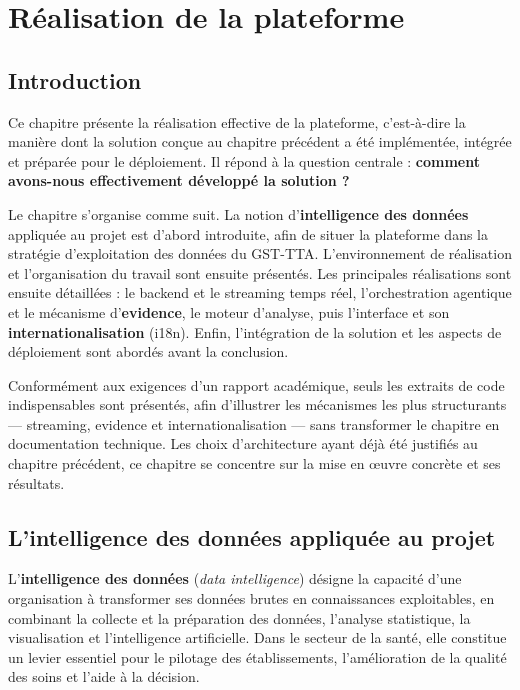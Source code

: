 \chapter{Réalisation de la plateforme}

\section{Introduction}

Ce chapitre présente la réalisation effective de la plateforme, c'est-à-dire la manière dont la solution conçue au chapitre précédent a été implémentée, intégrée et préparée pour le déploiement. Il répond à la question centrale : \textbf{comment avons-nous effectivement développé la solution ?}

Le chapitre s'organise comme suit. La notion d'\textbf{intelligence des données} appliquée au projet est d'abord introduite, afin de situer la plateforme dans la stratégie d'exploitation des données du GST-TTA. L'environnement de réalisation et l'organisation du travail sont ensuite présentés. Les principales réalisations sont ensuite détaillées : le backend et le streaming temps réel, l'orchestration agentique et le mécanisme d'\textbf{evidence}, le moteur d'analyse, puis l'interface et son \textbf{internationalisation} (i18n). Enfin, l'intégration de la solution et les aspects de déploiement sont abordés avant la conclusion.

Conformément aux exigences d'un rapport académique, seuls les extraits de code indispensables sont présentés, afin d'illustrer les mécanismes les plus structurants — streaming, evidence et internationalisation — sans transformer le chapitre en documentation technique. Les choix d'architecture ayant déjà été justifiés au chapitre précédent, ce chapitre se concentre sur la mise en œuvre concrète et ses résultats.

\section{L'intelligence des données appliquée au projet}

L'\textbf{intelligence des données} (\textit{data intelligence}) désigne la capacité d'une organisation à transformer ses données brutes en connaissances exploitables, en combinant la collecte et la préparation des données, l'analyse statistique, la visualisation et l'intelligence artificielle. Dans le secteur de la santé, elle constitue un levier essentiel pour le pilotage des établissements, l'amélioration de la qualité des soins et l'aide à la décision.

